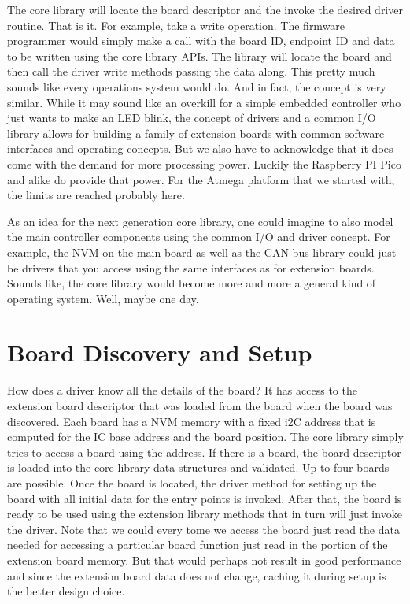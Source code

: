 The core library will locate the board descriptor and the invoke the desired driver routine. That is it. For example, take a write operation. The firmware programmer would simply make a call with the board ID, endpoint ID and data to be written using the core library APIs. The library will locate the board and then call the driver write methods passing the data along. This pretty much sounds like every operations system would do. And in fact, the concept is very similar. While it may sound like an overkill for a simple embedded controller who just wants to make an LED blink, the concept of drivers and a common I/O library allows for building a family of extension boards with common software interfaces and operating concepts. But we also have to acknowledge that it does come with the demand for more processing power. Luckily the Raspberry PI Pico and alike do provide that power. For the Atmega platform that we started with, the limits are reached probably here.

As an idea for the next generation core library, one could imagine to also model the main controller components using the common I/O and driver concept. For example, the NVM on the main board as well as the CAN bus library could just be drivers that you access using the same interfaces as for extension boards. Sounds like, the core library would become more and more a general kind of operating system. Well, maybe one day.

\section{Board Discovery and Setup}

How does a driver know all the details of the board? It has access to the extension board descriptor that was loaded from the board when the board was discovered. Each board has a NVM memory with a fixed i2C address that is computed for the IC base address and the board position. The core library simply tries to access a board using the address. If there is a board, the board descriptor is loaded into the core library data structures and validated. Up to four boards are possible. Once the board is located, the driver method for setting up the board with all initial data for the entry points is invoked. After that, the board is ready to be used using the extension library methods that in turn will just invoke the driver. Note that we could every tome we access the board just read the data needed for accessing a particular board function just read in the portion of the extension board memory. But that would perhaps not result in good performance and since the extension board data does not change, caching it during setup is the better design choice.

